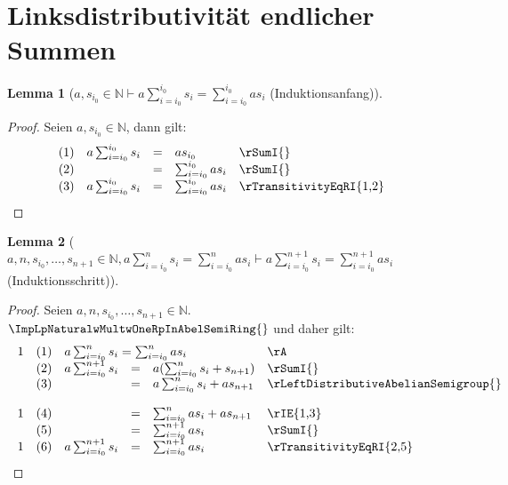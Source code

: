 \documentclass{book}
\theoremstyle{plain}
\newtheorem*{lemma}{Lemma} %
\theoremstyle{remark}
\theoremstyle{definition}
\begin{document}
\section{Linksdistributivität endlicher Summen}

\label{awsSubLbiSubZeroRbInNaturalImpaSumSubLbiEqualsiSubZeroRbPowerLbiSubZeroRbsSubiEqualsSumSubLbiEqualsiSubZeroRbPowerLbiSubZeroRbasSubi}
\begin{lemma}[\(a,s_{i_0}\in\mathbb{N}\vdash a\sum_{i=i_0}^{i_0} s_i=\sum_{i=i_0}^{i_0} as_i\) (Induktionsanfang)]
\end{lemma}
\begin{proof}
    Seien \(a,s_{i_0}\in\mathbb{N}\), dann gilt:
    \[
	\begin{array}{llcll p{5cm}}
              &  (1)  & a\sum_{i=i_0}^{i_0} s_i &=& as_{i_0} & \rSumI{} \\
              &  (2)  &  &=& \sum_{i=i_0}^{i_0} as_i & \rSumI{} \\
              &  (3)  &  a\sum_{i=i_0}^{i_0} s_i&=& \sum_{i=i_0}^{i_0} as_i & \rTransitivityEqRI{1,2} \\
        \end{array}
    \]
\end{proof}

\label{awnwsSubLbiSubZeroRbwDotswsSubLbnPlusOneRbInNaturalwaSumSubLbiEqualsiSubZeroRbPowerLbnRbsSubiEqualsSumSubLbiEqualsiSubZeroRbPowerLbnRbasSubiImpaSumSubLbiEqualsiSubZeroRbPowerLbnPlusOneRbsSubiEqualsSumSubLbiEqualsiSubZeroRbPowerLbnPlusOneRbasSubi}
\begin{lemma}[\(a,n,s_{i_0},\dots,s_{n+1}\in\mathbb{N},a\sum_{i=i_0}^{n} s_i=\sum_{i=i_0}^{n} as_i\vdash a\sum_{i=i_0}^{n+1} s_i=\sum_{i=i_0}^{n+1} as_i\) (Induktionsschritt)]
\end{lemma}
\begin{proof}
    Seien \(a,n,s_{i_0},\dots,s_{n+1}\in\mathbb{N}\). \(\ImpLpNaturalwMultwOneRpInAbelSemiRing{}\) und daher gilt:
    \[
	\begin{array}{llcll p{5cm}}
            1 &  (1)  & \multicolumn{3}{l}{a\sum_{i=i_0}^{n} s_i=\sum_{i=i_0}^{n} as_i} & \rA \\
              &  (2)  & a\sum_{i=i_0}^{n+1} s_i &=& a(\sum_{i=i_0}^{n} s_i+s_{n+1}) & \rSumI{} \\
              &  (3)  &  &=& a\sum_{i=i_0}^{n} s_i+as_{n+1} & \rLeftDistributiveAbelianSemigroup{} \\
            1 &  (4)  &  &=& \sum_{i=i_0}^{n} as_i+as_{n+1} & \rIE{1,3} \\
              &  (5)  &  &=& \sum_{i=i_0}^{n+1} as_i & \rSumI{} \\
            1 &  (6)  & a\sum_{i=i_0}^{n+1} s_i &=& \sum_{i=i_0}^{n+1} as_i & \rTransitivityEqRI{2,5} \\
        \end{array}
    \]
\end{proof}
\end{document}
